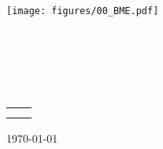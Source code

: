 \hypersetup{pageanchor=false}
\begin{titlepage}
\begin{center}
\texttt{[image: figures/00\_BME.pdf]}\\
\vspace{0.3cm}
\textbf{\bme}\\
\textmd{\vik}\\
\textmd{\viktanszek}\\[5cm]

\vspace{0.4cm}
{\huge \bfseries \vikcim}\\[0.8cm]
\vspace{0.5cm}
\textsc{\Large \vikdoktipus}\\[4cm]

{
	\renewcommand{\arraystretch}{0.85}
	\begin{tabular}{cc}
	 \makebox[7cm]{\emph{\keszitette}} & \makebox[7cm]{\emph{\konzulens}} \\ \noalign{\smallskip}
	 \makebox[7cm]{\szerzo} & \makebox[7cm]{\vikkonzulensA} \\
	\end{tabular}
}

\vfill
{\large \today}
\end{center}
\end{titlepage}
\hypersetup{pageanchor=false}

